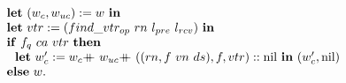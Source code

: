 \begin{figure}
$$\begin{array}{ll}
 \ \ \ \ \mbox{\textbf{let}}\ (w_c, w_{uc}) := w\  \mbox{\textbf{in}} \\ 
\ \ \ \ \mbox{\textbf{let}}\ vtr := (find\_vtr_{op} \ rn \ l_{pre} \ l_{rcv})\  \mbox{\textbf{in}} \\ 
\ \ \ \ \mbox{\textbf{if}} \ f_{q} \ ca \ vtr \ \mbox{\textbf{then}}  \\
\ \ \ \ \ \  \mbox{\textbf{let}}\ w_c' := w_c \doubleplus w_{uc} \doubleplus ((rn, f\ vn \ ds), f, vtr)::\text{nil} \  \mbox{\textbf{in}} \ (w_c',  \text{nil})\\
\ \ \ \ \mbox{\textbf{else}}  \ w.\\
\end{array}
$$
%

\end{figure}
